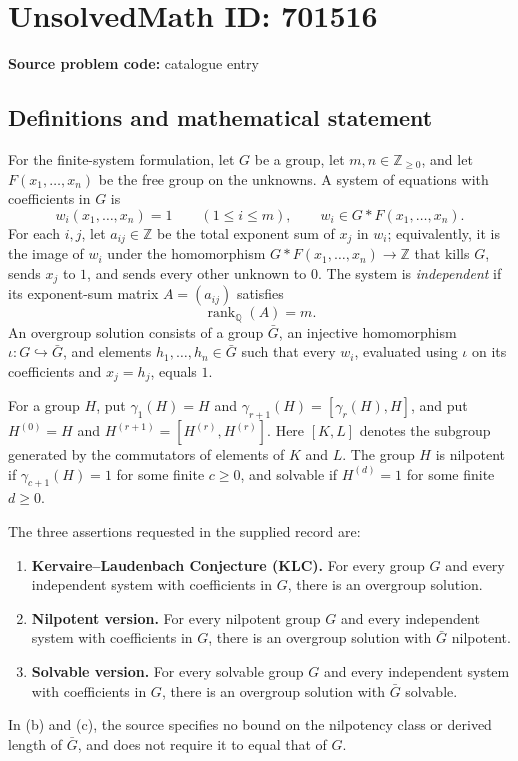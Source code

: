 \documentclass[11pt]{article}
\newcommand{\Z}{\mathbb{Z}}
\newcommand{\Q}{\mathbb{Q}}
\begin{document}
\section*{UnsolvedMath ID: 701516}
\textbf{Source problem code:} catalogue entry
\subsection{Definitions and mathematical statement}
For the finite-system formulation, let \(G\) be a group, let \(m,n\in\Z_{\geq 0}\), and let \(F(x_1,\ldots,x_n)\) be the free group on the unknowns. A system of equations with coefficients in \(G\) is
\[
 w_i(x_1,\ldots,x_n)=1\qquad(1\leq i\leq m),
 \qquad w_i\in G*F(x_1,\ldots,x_n).
\]
For each \(i,j\), let \(a_{ij}\in\Z\) be the total exponent sum of \(x_j\) in \(w_i\); equivalently, it is the image of \(w_i\) under the homomorphism \(G*F(x_1,\ldots,x_n)\to\Z\) that kills \(G\), sends \(x_j\) to \(1\), and sends every other unknown to \(0\). The system is \emph{independent} if its exponent-sum matrix \(A=(a_{ij})\) satisfies
\[
 \operatorname{rank}_{\Q}(A)=m.
\]
An overgroup solution consists of a group \(\bar G\), an injective homomorphism \(\iota:G\hookrightarrow\bar G\), and elements \(h_1,\ldots,h_n\in\bar G\) such that every \(w_i\), evaluated using \(\iota\) on its coefficients and \(x_j=h_j\), equals \(1\).

For a group \(H\), put \(\gamma_1(H)=H\) and \(\gamma_{r+1}(H)=[\gamma_r(H),H]\), and put \(H^{(0)}=H\) and \(H^{(r+1)}=[H^{(r)},H^{(r)}]\). Here \([K,L]\) denotes the subgroup generated by the commutators of elements of \(K\) and \(L\). The group \(H\) is nilpotent if \(\gamma_{c+1}(H)=1\) for some finite \(c\geq0\), and solvable if \(H^{(d)}=1\) for some finite \(d\geq0\).

The three assertions requested in the supplied record are:
\begin{enumerate}
\item[(a)] \textbf{Kervaire--Laudenbach Conjecture (KLC).} For every group \(G\) and every independent system with coefficients in \(G\), there is an overgroup solution.
\item[(b)] \textbf{Nilpotent version.} For every nilpotent group \(G\) and every independent system with coefficients in \(G\), there is an overgroup solution with \(\bar G\) nilpotent.
\item[(c)] \textbf{Solvable version.} For every solvable group \(G\) and every independent system with coefficients in \(G\), there is an overgroup solution with \(\bar G\) solvable.
\end{enumerate}
In (b) and (c), the source specifies no bound on the nilpotency class or derived length of \(\bar G\), and does not require it to equal that of \(G\).
\end{document}
